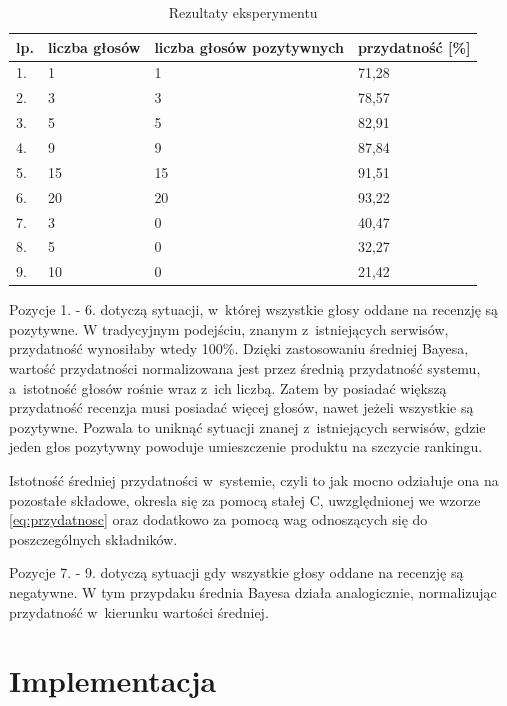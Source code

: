 \begin{table}[H]
\centering
    \begin{tabular}{|l|l|l|l|}
    \hline
    lp. & liczba głosów & liczba głosów pozytywnych & przydatność [\%] \\ \hline\hline
    1. & 1 & 1 & 71,28 \\ \hline
    2. & 3 & 3 & 78,57 \\ \hline
    3. & 5 & 5 & 82,91 \\ \hline
    4. & 9 & 9 & 87,84 \\ \hline
    5. & 15 & 15 & 91,51 \\ \hline
    6. & 20 & 20 & 93,22 \\ \hline
    7. & 3 & 0 & 40,47 \\ \hline
    8. & 5 & 0 & 32,27 \\ \hline
    9. & 10 & 0 & 21,42 \\ \hline
    \end{tabular}
	\caption{Rezultaty eksperymentu}\label{tab:test1}
\end{table}

Pozycje 1. - 6. dotyczą sytuacji, w~której wszystkie głosy oddane na recenzję są pozytywne. W tradycyjnym podejściu, znanym z~istniejących serwisów, przydatność wynosiłaby wtedy 100\%. Dzięki zastosowaniu średniej Bayesa, wartość przydatności normalizowana jest przez średnią przydatność systemu, a~istotność głosów rośnie wraz z~ich liczbą. Zatem by posiadać większą przydatność recenzja musi posiadać więcej głosów, nawet jeżeli wszystkie są pozytywne. Pozwala to uniknąć sytuacji znanej z~istniejących serwisów, gdzie jeden głos pozytywny powoduje umieszczenie produktu na szczycie rankingu.

Istotność średniej przydatności w~systemie, czyli to jak mocno odziałuje ona na pozostałe składowe, okresla się za pomocą stałej C, uwzględnionej we wzorze \ref{eq:przydatnosc} oraz dodatkowo za pomocą wag odnoszących się do poszczególnych składników.

Pozycje 7. - 9. dotyczą sytuacji gdy wszystkie głosy oddane na recenzję są negatywne. W tym przypdaku średnia Bayesa działa analogicznie, normalizując przydatność w~kierunku wartości średniej.


\section{Implementacja}

